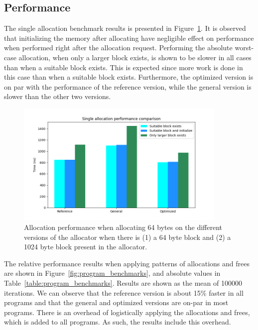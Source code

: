 
\subsection{Performance}
\label{sec:results:performance}

The single allocation benchmark results is presented in Figure~\ref{fig:allocation_performance}. It is observed that initializing the memory after allocating have negligible effect on performance when performed right after the allocation request. Performing the absolute worst-case allocation, when only a larger block exists, is shown to be slower in all cases than when a suitable block exists. This is expected since more work is done in this case than when a suitable block exists. Furthermore, the optimized version is on par with the performance of the reference version, while the general version is slower than the other two versions. 

\begin{figure}[H]
    \centering
    \includegraphics[width=0.90\textwidth]{figures/allocation_performance.png}
    \caption{Allocation performance when allocating 64 bytes on the different versions of the allocator when there is (1) a 64 byte block and (2) a 1024 byte block present in the allocator.}
    \label{fig:allocation_performance}
\end{figure}

The relative performance results when applying patterns of allocations and frees are shown in Figure~\ref{fig:program_benchmarks}, and absolute values in Table~\ref{table:program_benchmarks}. Results are shown as the mean of 100000 iterations. We can observe that the reference version is about 15\% faster in all programs and that the general and optimized versions are on-par in most programs. There is an overhead of logistically applying the allocations and frees, which is added to all programs. As such, the results include this overhead.

